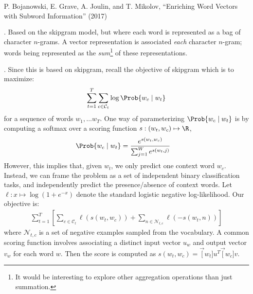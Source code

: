 \documentclass[11pt]{article}
\begin{document}
\vspace{-1em}
{\footnotesize P. Bojanowski, E. Grave, A. Joulin, and T. Mikolov, ``Enriching Word Vectors with Subword Information'' (2017)}

\myspace
\p {}. Based on the skipgram model, but where each word is represented as a bag of character $n$-grams. A vector representation is associated \textit{each} character $n$-gram; words being represented as the \textit{sum}\footnote{It would be interesting to explore other aggregation operations than just summation.} of these representations.

\myspace
\p {}. Since this is based on skipgram, recall the objective of skipgram which is to maximize:
\begin{align}
\sum_{t = 1}^T \sum_{c \in \mathcal{C}_t} \log \Prob{w_c \mid w_t}
\end{align}
for a sequence of words $w_1, \ldots w_T$. One way of parameterizing $\Prob{w_c \mid w_t}$ is by computing a softmax over a scoring function $s: (w_t, w_c) \mapsto \R$,
\begin{align}
\Prob{w_c \mid w_t} &= \frac{
	e^{s(w_t, w_c)}  }{
	\sum_{j = 1}^{W} e^{s(w_t, j)}
}
\end{align}
However, this implies that, given $w_t$, we only predict one context word $w_c$. Instead, we can frame the problem as a set of independent binary classification tasks, and independently predict the presence/absence of context words. Let $\ell: x \mapsto \log(1 + e^{-x})$ denote the standard logistic negative log-likelihood. Our objective is:
\begin{align}
\sum_{t = 1}^T \left[
\sum_{c \in \mathcal{C}_t} \ell(s(w_t, w_c)) + \sum_{n \in \mathcal{N}_{t,c}} \ell(-s(w_t, n))
\right]
\end{align}
where $\mathcal{N}_{t,c}$ is a set of negative examples sampled from the vocabulary. A common scoring function involves associating a distinct input vector $u_w$ and output vector $v_w$ for each word $w$. Then the score is computed as $s(w_t, w_c) = \vec[w_t]{u}^T \vec[w_c]{v}$. 
\end{document}
